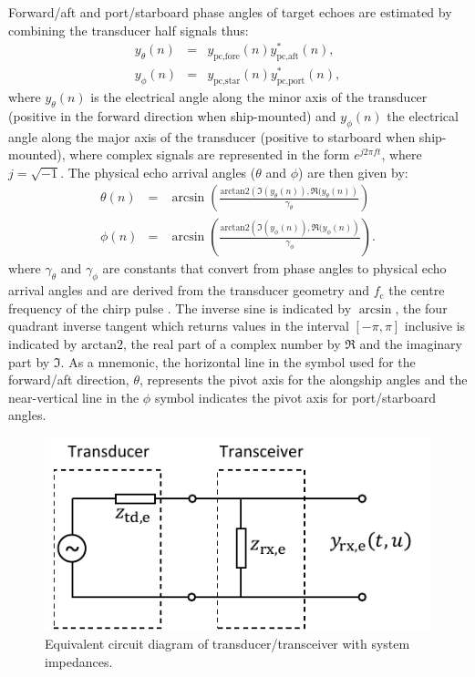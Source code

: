\documentclass[preprint,12pt,TurnOnLineNumbers]{JASAnew}
\newcommand{\timesym}{t}
\newcommand{\freqsym}{f}
\newcommand{\samplesymt}{n}
\newcommand{\fc}{f_{\textrm{c}}}
\newcommand{\athw}{\phi}
\newcommand{\along}{\theta}
\newcommand{\atan}{\textrm{arctan2}}
\newcommand{\anglefalong}{\gamma_\along}
\newcommand{\anglefathw}{\gamma_\athw}
\begin{document}
Forward/aft and port/starboard phase angles of target echoes are estimated by combining the transducer half signals thus: 
%
\begin{eqnarray}
\label{eq:phase1}
y_\along(\samplesymt) & = & y_{\textrm{pc,fore}}(\samplesymt) y_{\textrm{pc,aft}}^*(\samplesymt), \\
y_\athw(\samplesymt) & = & y_{\textrm{pc,star}}(\samplesymt) y_{\textrm{pc,port}}^*(\samplesymt),
\end{eqnarray}
%
where $y_\along(\samplesymt)$ is the electrical angle along the minor axis of the transducer (positive in the forward direction when ship-mounted) and $y_\athw(\samplesymt)$ the electrical angle along the major axis of the transducer (positive to starboard when ship-mounted), where complex signals are represented in the form $e^{j 2\pi \freqsym \timesym}$, where $j = \sqrt{-1}$. The physical echo arrival angles ($\along$ and $\athw$) are then given by:
%
\begin{eqnarray}
\label{eq:phase2}
\along(\samplesymt) & = & \arcsin\left( \frac{\atan\left( \Im(y_\along(\samplesymt)), \Re(y_\along(\samplesymt) \right)}{\anglefalong}\right) \\
\athw(\samplesymt) & = & \arcsin\left( \frac{\atan\left( \Im(y_\athw(\samplesymt)), \Re(y_\athw(\samplesymt) \right)}{\anglefathw}\right).
\end{eqnarray}
%
where $\anglefalong$ and $\anglefathw$ are constants that convert from phase angles to physical echo arrival angles and are derived from the transducer geometry and $\fc$ the centre frequency of the chirp pulse \citep{ehrenberg1979}. The inverse sine is indicated by $\arcsin$, the four quadrant inverse tangent which returns values in the interval $[-\pi, \pi]$ inclusive is indicated by $\atan$, the real part of a complex number by $\Re$ and the imaginary part by $\Im$. As a mnemonic, the horizontal line in the symbol used for the forward/aft direction, $\along$, represents the pivot axis for the alongship angles and the near-vertical line in the $\athw$ symbol indicates the pivot axis for port/starboard angles.
%
\begin{figure}
\includegraphics[width=\reprintcolumnwidth]{Fig_impedances}
\caption{\label{fi:impedances}Equivalent circuit diagram of transducer/transceiver with system impedances.}
\end{figure}
\end{document}
